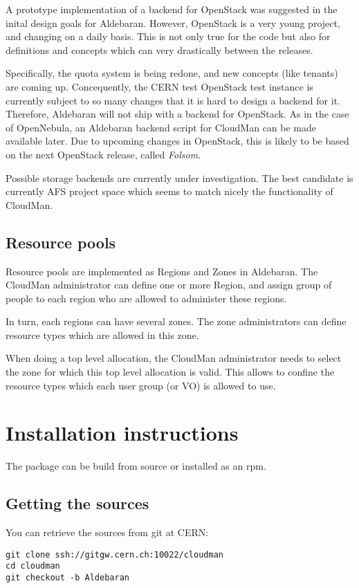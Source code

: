 \documentclass[12pt]{article}
\begin{document}
A prototype implementation of a backend for OpenStack was suggested in the 
inital design goals for Aldebaran. However, OpenStack is a very young project, and changing 
on a daily basis. This is not only true for the code but also for definitions 
and concepts which can very drastically between the releases. 
 
Specifically, the quota system is being redone, and new concepts 
(like tenants) are coming up. Concequently, the CERN test OpenStack test instance 
is currently subject to so many changes that it is hard to design a backend for it.
Therefore, Aldebaran will not ship with a backend for OpenStack. 
As in the case of OpenNebula, an Aldebaran backend script for CloudMan can be made available later.
Due to upcoming changes in OpenStack, this is likely to be based on the 
next OpenStack release, called {\it Folsom}.

Possible storage backends are currently under investigation. The best candidate is currently AFS 
project space which seems to match nicely the functionality of CloudMan. 

\subsection{Resource pools}
Resource pools are implemented as Regions and Zones in Aldebaran. The CloudMan administrator can define one or more Region, and assign group of people to each region who are allowed to administer these regions. 

In turn, each regions can have several zones. The zone administrators can define
resource types which are allowed in this zone.

When doing a top level allocation, the CloudMan administrator needs to select the zone for which this top level allocation is valid. This allows to confine the 
resource types which each user group (or VO) is allowed to use. 


\section{Installation instructions}
The package can be build from source or installed as an rpm. 

\subsection{Getting the sources}
You can retrieve the sources from git at CERN:
\begin{verbatim}
git clone ssh://gitgw.cern.ch:10022/cloudman
cd cloudman
git checkout -b Aldebaran
\end{verbatim}
\end{document}
